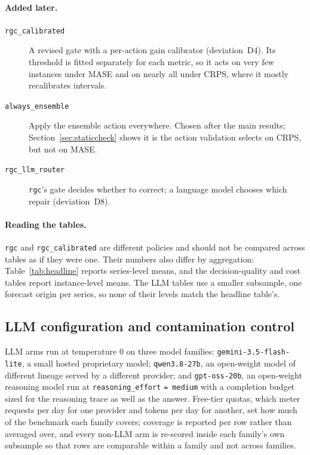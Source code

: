 \paragraph{Added later.}
\begin{description}
  \item[\texttt{rgc\_calibrated}] A revised gate with a per-action gain calibrator
  (deviation~D4). Its threshold is fitted separately for each metric, so it acts on very
  few instances under MASE and on nearly all under CRPS, where it mostly recalibrates
  intervals.
  \item[\texttt{always\_ensemble}] Apply the ensemble action everywhere. Chosen
  after the main results; Section~\ref{sec:staticcheck} shows it is the action
  validation selects on CRPS, but not on MASE.
  \item[\texttt{rgc\_llm\_router}] \texttt{rgc}'s gate decides whether to correct; a
  language model chooses which repair (deviation~D8).
\end{description}

\paragraph{Reading the tables.}
\texttt{rgc} and \texttt{rgc\_calibrated} are different policies and should not be
compared across tables as if they were one. Their numbers also differ by aggregation:
Table~\ref{tab:headline} reports series-level means, and the decision-quality and cost
tables report instance-level means. The LLM tables use a smaller subsample, one
forecast origin per series, so none of their levels match the headline table's.

\subsection{LLM configuration and contamination control}

LLM arms run at temperature 0 on three model families: \texttt{gemini-3.5-flash-lite},
a small hosted proprietary model; \texttt{qwen3.8-27b}, an open-weight model of
different lineage served by a different provider; and \texttt{gpt-oss-20b}, an
open-weight reasoning model run at \texttt{reasoning\_effort} \texttt{= medium}
with a completion budget sized for the reasoning trace as well as the answer. Free-tier
quotas, which meter requests per day for one provider and tokens per day for another,
set how much of the benchmark each family covers; coverage is reported per row rather
than averaged over, and every non-LLM arm is re-scored inside each family's own
subsample so that rows are comparable within a family and not across families.

